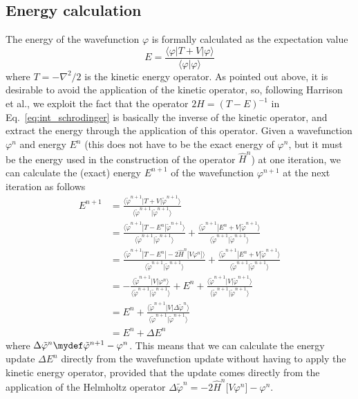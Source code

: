 \subsection{Energy calculation}
The energy of the wavefunction $\varphi$ is formally calculated as the 
expectation value
\begin{equation}
    E = \frac{\langle \varphi| T + V | \varphi\rangle}{\langle \varphi|\varphi\rangle} 
\end{equation}
where $T=-\nabla^2/2$ is the kinetic energy operator. As pointed out 
above, it is desirable to avoid the application of the kinetic operator, 
so, following Harrison et al.\cite{Harrison}, we exploit the fact that 
the operator $2\hat{H} = (T - E)^{-1}$ in Eq.~\ref{eq:int_schrodinger} 
is basically the inverse of the kinetic operator, and extract the energy 
through the application of this operator. Given a wavefunction $\varphi^{n}$ 
and energy $E^{n}$ (this does not have to be the exact energy of $\varphi^{n}$, 
but it must be the energy used in the construction of the operator $\hat{H}^{n}$) 
at one iteration, we can calculate the (exact) energy $E^{n+1}$ of the 
wavefunction $\varphi^{n+1}$ at the next iteration as follows
\begin{align}
    E^{n+1}
    &=	\frac{\langle\tilde{\varphi}^{n+1}| T + V | \tilde{\varphi}^{n+1}\rangle}
	{\langle\tilde{\varphi}^{n+1}|\tilde{\varphi}^{n+1}\rangle}\\
    &=	\frac{\langle\tilde{\varphi}^{n+1}| T - E^{n} | \tilde{\varphi}^{n+1}\rangle}
	{\langle\tilde{\varphi}^{n+1}|\tilde{\varphi}^{n+1}\rangle}
    +	\frac{\langle\tilde{\varphi}^{n+1}| E^{n} + V | \tilde{\varphi}^{n+1}\rangle}
	{\langle\tilde{\varphi}^{n+1}|\tilde{\varphi}^{n+1}\rangle}\\
    &=	\frac{\langle\tilde{\varphi}^{n+1}| T - E^{n} | -2\hat{H}^{n}\big[V\varphi^{n}\big]\rangle}
	{\langle\tilde{\varphi}^{n+1}|\tilde{\varphi}^{n+1}\rangle}
    +	\frac{\langle\tilde{\varphi}^{n+1}| E^{n} + V |\tilde{\varphi}^{n+1}\rangle}
	{\langle\tilde{\varphi}^{n+1}|\tilde{\varphi}^{n+1}\rangle}\\
    &= -\frac{\langle\tilde{\varphi}^{n+1}| V |\varphi^{n}\rangle}
	{\langle\tilde{\varphi}^{n+1}|\tilde{\varphi}^{n+1}\rangle}
    +	E^{n}
    +	\frac{\langle\tilde{\varphi}^{n+1}| V |\tilde{\varphi}^{n+1}\rangle}
	{\langle\tilde{\varphi}^{n+1}|\tilde{\varphi}^{n+1}\rangle}\\
    &= E^{n} + 
	\frac{\langle\tilde{\varphi}^{n+1}| V |\Delta\tilde{\varphi}^{n}\rangle}
	{\langle\tilde{\varphi}^{n+1}|\tilde{\varphi}^{n+1}\rangle}\\
    &= E^{n} + \Delta E^{n}
\end{align}
where $\Delta \tilde{\varphi}^{n} \mydef \tilde{\varphi}^{n+1} - \varphi^{n}$. 
This means that we can calculate the energy update $\Delta E^{n}$ directly from 
the wavefunction update without having to apply the kinetic energy operator, 
provided that the update comes directly from the application of the Helmholtz 
operator $\Delta\tilde{\varphi}^n = -2 \hat{H}^n\big[V\varphi^n\big] - \varphi^n$.

